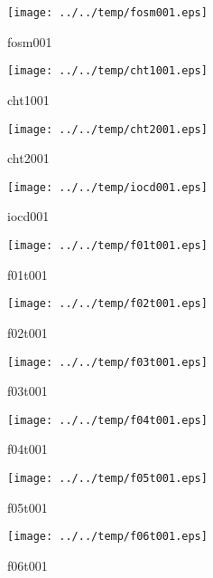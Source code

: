 \documentclass[a4paper,twoside,11pt]{article}
\makeatletter
\def\maxwidth{%
  \ifdim\Gin@nat@width>\linewidth
    \linewidth
  \else
    \Gin@nat@width
  \fi
}
\makeatother
\begin{document}
\clearpage
\begin{figure}
  \centering
  \texttt{[image: ../../temp/fosm001.eps]}
  \caption{fosm001}
  \label{fig:fosm001}
\end{figure}

\begin{figure}
  \centering
  \texttt{[image: ../../temp/cht1001.eps]}
  \caption{cht1001}
  \label{fig:cht1001}
\end{figure}

\clearpage
\begin{figure}
  \centering
  \texttt{[image: ../../temp/cht2001.eps]}
  \caption{cht2001}
  \label{fig:cht2001}
\end{figure}

\begin{figure}
  \centering
  \texttt{[image: ../../temp/iocd001.eps]}
  \caption{iocd001}
  \label{fig:iocd001}
\end{figure}

\clearpage
\begin{figure}
  \centering
  \texttt{[image: ../../temp/f01t001.eps]}
  \caption{f01t001}
  \label{fig:f01t001}
\end{figure}

\begin{figure}
  \centering
  \texttt{[image: ../../temp/f02t001.eps]}
  \caption{f02t001}
  \label{fig:f02t001}
\end{figure}

\clearpage
\begin{figure}
  \centering
  \texttt{[image: ../../temp/f03t001.eps]}
  \caption{f03t001}
  \label{fig:f03t001}
\end{figure}

\begin{figure}
  \centering
  \texttt{[image: ../../temp/f04t001.eps]}
  \caption{f04t001}
  \label{fig:f04t001}
\end{figure}

\clearpage
\begin{figure}
  \centering
  \texttt{[image: ../../temp/f05t001.eps]}
  \caption{f05t001}
  \label{fig:f05t001}
\end{figure}

\begin{figure}
  \centering
  \texttt{[image: ../../temp/f06t001.eps]}
  \caption{f06t001}
  \label{fig:f06t001}
\end{figure}
\end{document}
